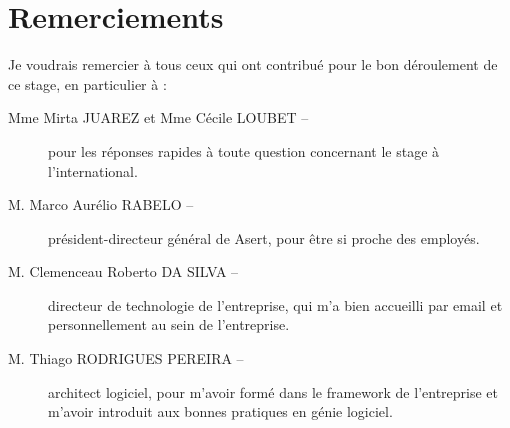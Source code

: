 \section*{Remerciements}

Je voudrais remercier à tous ceux qui ont contribué pour le bon déroulement de ce stage, en particulier à :

\vspace{1em}

\begin{description}
\item[Mme Mirta JUAREZ et Mme Cécile LOUBET --] pour les réponses rapides à toute question concernant le stage à l'international.
\item[M. Marco Aurélio RABELO --] président-directeur général de Asert, pour être si proche des employés.
\item[M. Clemenceau Roberto DA SILVA --] directeur de technologie de l'entreprise, qui m'a bien accueilli par email et personnellement au sein de l'entreprise.
\item[M. Thiago RODRIGUES PEREIRA --] architect logiciel, pour m'avoir formé dans le framework de l'entreprise et m'avoir introduit aux bonnes pratiques en génie logiciel.
\end{description}
